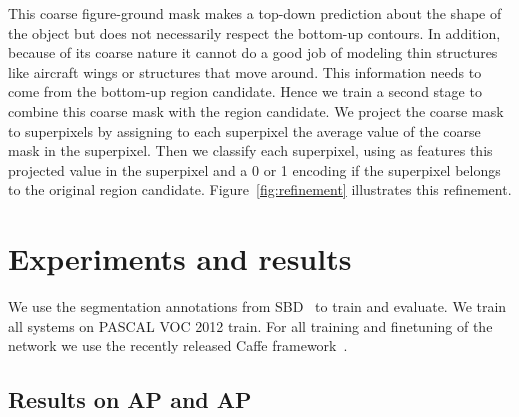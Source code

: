 \documentclass[runningheads]{llncs}
\begin{document}
This coarse figure-ground mask makes a top-down prediction about the shape of the object but does not necessarily respect the bottom-up contours. In addition, because of its coarse nature it cannot do a good job of modeling thin structures like aircraft wings or structures that move around. This information needs to come from the bottom-up region candidate. Hence we train a second stage to combine this coarse mask with the region candidate. We project the coarse mask to superpixels by assigning to each superpixel the average value of the coarse mask in the superpixel. Then we classify each superpixel, using as features this projected value in the superpixel and a 0 or 1 encoding if the superpixel belongs to the original region candidate.  
Figure~\ref{fig:refinement} illustrates this refinement.
  
\section{Experiments and results}
\label{sec:experiments}
We use the segmentation annotations from SBD~\cite{HariharanICCV11} to train and evaluate. We train all systems on PASCAL VOC 2012 train. For all training and finetuning of the network we use the recently released Caffe framework~\cite{Jia13}.  

\subsection{Results on AP and AP}
\end{document}
